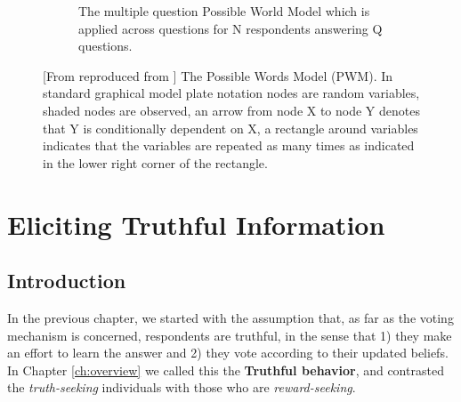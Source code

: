 \documentclass{report}
\theoremstyle{definition}
\begin{document}
\begin{figure}[]
\begin{subfigure}{\textwidth}
\caption{The multiple question Possible World Model which is applied across questions for N respondents answering Q questions.}
\label{fig:pwm_multiple}
\end{subfigure}
\caption{[From reproduced from \cite{mccoy:stat}] The Possible Words Model (PWM). In standard graphical model plate notation nodes are random variables, shaded nodes are observed, an arrow from node X to node Y denotes that Y is conditionally dependent on X, a rectangle around variables indicates that the variables are repeated as many times as indicated in the lower right corner of the rectangle.}
\end{figure}







\chapter{Eliciting Truthful Information}
\label{ch:truthful}
\section{Introduction}
In the previous chapter, we started with the assumption that, as far as the voting mechanism is concerned, respondents are truthful, in the sense that 1) they make an effort to learn the answer and 2) they vote according to their updated beliefs. In Chapter \ref{ch:overview} we called this the \textbf{Truthful behavior}, and contrasted the \emph{truth-seeking} individuals with those who are \emph{reward-seeking}.
\end{document}
